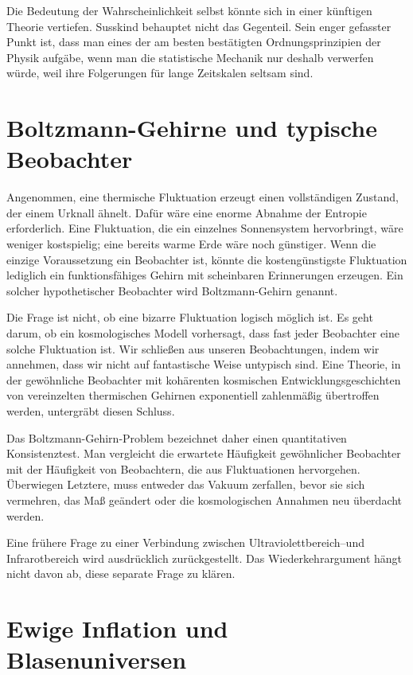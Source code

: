 Die Bedeutung der Wahrscheinlichkeit selbst könnte sich in einer künftigen Theorie vertiefen. Susskind behauptet nicht das Gegenteil. Sein enger gefasster Punkt ist, dass man eines der am besten bestätigten Ordnungsprinzipien der Physik aufgäbe, wenn man die statistische Mechanik nur deshalb verwerfen würde, weil ihre Folgerungen für lange Zeitskalen seltsam sind.

\section{Boltzmann-Gehirne und typische Beobachter}

Angenommen, eine thermische Fluktuation erzeugt einen vollständigen Zustand, der einem Urknall ähnelt. Dafür wäre eine enorme Abnahme der Entropie erforderlich. Eine Fluktuation, die ein einzelnes Sonnensystem hervorbringt, wäre weniger kostspielig; eine bereits warme Erde wäre noch günstiger. Wenn die einzige Voraussetzung ein Beobachter ist, könnte die kostengünstigste Fluktuation lediglich ein funktionsfähiges Gehirn mit scheinbaren Erinnerungen erzeugen. Ein solcher hypothetischer Beobachter wird Boltzmann-Gehirn genannt.

Die Frage ist nicht, ob eine bizarre Fluktuation logisch möglich ist. Es geht darum, ob ein kosmologisches Modell vorhersagt, dass fast jeder Beobachter eine solche Fluktuation ist. Wir schließen aus unseren Beobachtungen, indem wir annehmen, dass wir nicht auf fantastische Weise untypisch sind. Eine Theorie, in der gewöhnliche Beobachter mit kohärenten kosmischen Entwicklungsgeschichten von vereinzelten thermischen Gehirnen exponentiell zahlenmäßig übertroffen werden, untergräbt diesen Schluss.

Das Boltzmann-Gehirn-Problem bezeichnet daher einen quantitativen Konsistenztest. Man vergleicht die erwartete Häufigkeit gewöhnlicher Beobachter mit der Häufigkeit von Beobachtern, die aus Fluktuationen hervorgehen. Überwiegen Letztere, muss entweder das Vakuum zerfallen, bevor sie sich vermehren, das Maß geändert oder die kosmologischen Annahmen neu überdacht werden.

Eine frühere Frage zu einer Verbindung zwischen Ultraviolettbereich--und Infrarotbereich wird ausdrücklich zurückgestellt. Das Wiederkehrargument hängt nicht davon ab, diese separate Frage zu klären.

\section{Ewige Inflation und Blasenuniversen}


